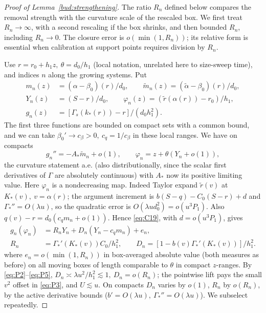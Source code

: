 \begin{proof}[Proof of Lemma~\ref{bud:strengthening}]
The ratio \(R_n\) defined below compares the removal strength with the
curvature scale of the rescaled box. We first treat \(R_n\to\infty\),
with a second rescaling if the box shrinks, and then bounded \(R_n\),
including \(R_n\to0\). The closure error is
\(o(\min(1,R_n))\); its relative form is essential when calibration
at support points requires division by \(R_n\).


Use \(r=r_0+h_1 z,\ \theta=d_0/h_1\) (local notation, unrelated here to size-sweep time), and indices \(n\) along the growing systems. Put
\[
\begin{aligned}
 m_n(z)&=(\alpha-\beta_0)(r)/d_0,\qquad
 \widetilde m_n(z)=(\widetilde\alpha-\beta_0)(r)/d_0,\\
 Y_n(z)&=(S-r)/d_0,\qquad
 \varphi_n(z)=(\widetilde r(\alpha(r))-r_0)/h_1,\\
 g_n(z)&=[\Gamma_s(k_*(r))-r]/(d_0 h_1^2).
\end{aligned}
\]
The first three functions are bounded on compact sets with a common bound, and we can take \(\beta_0'\to c_\beta>0,\ c_q=1/c_\beta\) in these local ranges. We have on compacts
\[
 g_n''=-A_*\widetilde m_n+o(1),\qquad \varphi_n=z+\theta(Y_n+o(1)),
\]
the curvature statement a.e. (also distributionally, since the scalar first derivatives of \(\Gamma\) are absolutely continuous) with \(A_*\) now its positive limiting value. Here \(\varphi_n\) is a nondecreasing map. Indeed Taylor expand \(\widetilde r(v)\) at \(K_*(v),\ v=\alpha(r)\); the argument increment is \(b(S-q)-C_0(S-r)+d\) and \(\Gamma_*''=O(\lambda u)\), so the quadratic error is \(O(\lambda u d_0^2)=o(u^3P_1)\). Also \(q(v)-r=d_0(c_qm_n+o(1))\). Hence \eqref{eq:C19}, with \(d=o(u^3P_1)\), gives
\[
\begin{aligned}
 g_n(\varphi_n)&=R_n Y_n + D_n(Y_n-c_qm_n)+e_n,\\
 R_n&=\Gamma_*'(K_*(v)) C_0/h_1^2,\qquad
 D_n=[1-b(v)\Gamma_*'(K_*(v))]/h_1^2 .
\end{aligned}
                                                                    \tag{C20}\label{eq:C20}
\]
where \(e_n=o(\min(1,R_n))\) in box-averaged absolute value (both measures as before) on all moving boxes of length comparable to \(\theta\) in compact \(z\)-ranges. By \eqref{eq:P2}--\eqref{eq:P5},
\(D_n\asymp\lambda u^2/h_1^2\lesssim1,\ D_n=o(R_n)\); the pointwise lift pays the small \(v^2\) offset in \eqref{eq:P3}, and \(U\lesssim u\). On compacts \(D_n\) varies by \(o(1)\), \(R_n\) by \(o(R_n)\), by the active derivative bounds (\(b'=O(\lambda u),\ \Gamma_*''=O(\lambda u)\)). We subselect repeatedly.


\end{proof}
